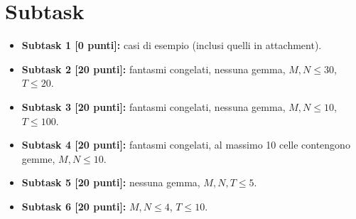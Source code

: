 

\section*{Subtask}
\begin{itemize}
\item \textbf{Subtask 1 [0 punti]:} casi di esempio (inclusi quelli in attachment).
\item \textbf{Subtask 2 [20 punti]:} fantasmi congelati, nessuna gemma, $M,N \le 30$, $T \le 20$.
\item \textbf{Subtask 3 [20 punti]:} fantasmi congelati, nessuna gemma, $M,N \le 10$, $T \le 100$.
\item \textbf{Subtask 4 [20 punti]:} fantasmi congelati, al massimo 10 celle contengono gemme, $M,N \le 10$.
\item \textbf{Subtask 5 [20 punti]:} nessuna gemma, $M,N,T \le 5$.
\item \textbf{Subtask 6 [20 punti]:} $M,N \le 4$, $T\le 10$.
\end{itemize}



